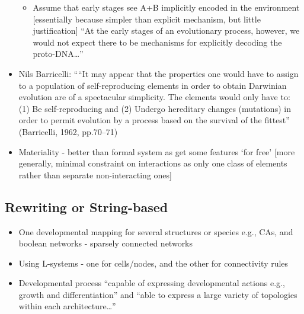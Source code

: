 \begin{itemize}
\begin{itemize}
		\item
		
		Assume that early stages see A+B implicitly encoded in the
		environment {[}essentially because simpler than explicit mechanism,
		but little justification{]} ``At the early stages of an evolutionary
		process, however, we would not expect there to be mechanisms for
		explicitly decoding the proto-DNA\ldots{}''
		
	\end{itemize}
	\item
	
	Nils Barricelli: ````It may appear that the properties one would have
	to assign to a population of self-reproducing elements in order to
	obtain Darwinian evolution are of a spectacular simplicity. The
	elements would only have to: (1) Be self-reproducing and (2) Undergo
	hereditary changes (mutations) in order to permit evolution by a
	process based on the survival of the fittest'' (Barricelli, 1962,
	pp.70--71)
	
	\item
	
	Materiality - better than formal system as get some features `for
	free' {[}more generally, minimal constraint on interactions as only
	one class of elements rather than separate non-interacting ones{]}
	
\end{itemize}
		
\subsection{Rewriting or String-based}
		
\autocite{Antonakopoulos:2011th}
		
		\begin{itemize}
			\item
			
			One developmental mapping for several structures or species e.g., CAs,
			and boolean networks - sparsely connected networks
			
			\item
			
			Using L-systems - one for cells/nodes, and the other for connectivity
			rules
			
			\item
			
			Developmental process ``capable of expressing developmental actions
			e.g., growth and differentiation'' and ``able to express a large
			variety of topologies within each architecture\ldots{}''
			
		\end{itemize}
		
